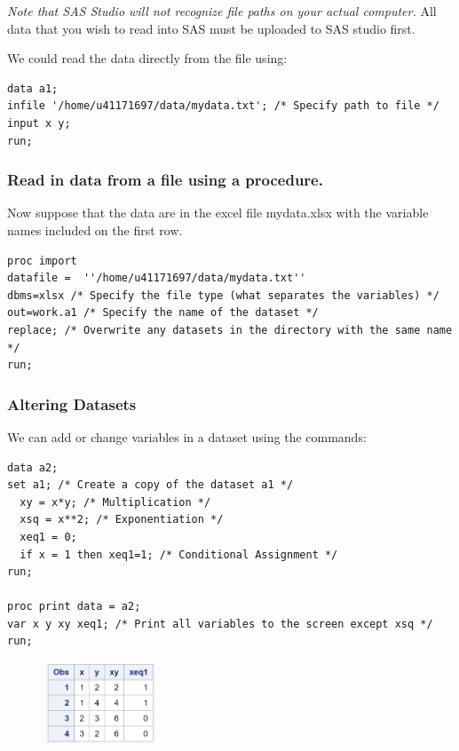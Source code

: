 \documentclass[12pt]{../notes}
\begin{document}
\nspace
\textit{Note that SAS Studio will not recognize file paths on your actual computer.} All data that you wish to read into SAS must be uploaded to SAS studio first. 

\nspace
We could read the data directly from the file using:

\begin{verbatim}
data a1; 
infile '/home/u41171697/data/mydata.txt'; /* Specify path to file */
input x y; 
run; 
\end{verbatim}

\subsubsection*{Read in data from a file using a procedure.}
Now suppose that the data are in the excel file mydata.xlsx with the variable names included on the first row. 

\begin{verbatim}
proc import
datafile =  ''/home/u41171697/data/mydata.txt'' 
dbms=xlsx /* Specify the file type (what separates the variables) */
out=work.a1 /* Specify the name of the dataset */
replace; /* Overwrite any datasets in the directory with the same name */
run; 
\end{verbatim}

\subsubsection*{Altering Datasets}
We can add or change variables in a dataset using the commands:

\begin{verbatim}
data a2; 
set a1; /* Create a copy of the dataset a1 */
  xy = x*y; /* Multiplication */
  xsq = x**2; /* Exponentiation */
  xeq1 = 0;
  if x = 1 then xeq1=1; /* Conditional Assignment */
run;

proc print data = a2; 
var x y xy xeq1; /* Print all variables to the screen except xsq */
run;
\end{verbatim}

\begin{figure}[H]
\centering
\includegraphics[width = 0.3\textwidth]{../figures/module1/sas2.png}
\end{figure}
\end{document}
